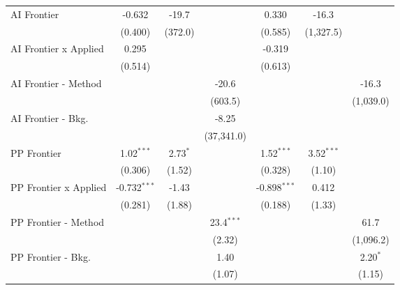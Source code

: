 \begin{tabular}{lcccccc}
   AI Frontier                    & -0.632         & -19.7      &               & 0.330          & -16.3        &   \\   
                                  & (0.400)        & (372.0)    &               & (0.585)        & (1,327.5)    &   \\   
   AI Frontier x Applied          & 0.295          &            &               & -0.319         &              &   \\   
                                  & (0.514)        &            &               & (0.613)        &              &   \\   
   AI Frontier - Method           &                &            & -20.6         &                &              & -16.3\\   
                                  &                &            & (603.5)       &                &              & (1,039.0)\\   
   AI Frontier - Bkg.             &                &            & -8.25         &                &              &   \\   
                                  &                &            & (37,341.0)    &                &              &   \\   
   PP Frontier                    & 1.02$^{***}$   & 2.73$^{*}$ &               & 1.52$^{***}$   & 3.52$^{***}$ &   \\   
                                  & (0.306)        & (1.52)     &               & (0.328)        & (1.10)       &   \\   
   PP Frontier x Applied          & -0.732$^{***}$ & -1.43      &               & -0.898$^{***}$ & 0.412        &   \\   
                                  & (0.281)        & (1.88)     &               & (0.188)        & (1.33)       &   \\   
   PP Frontier - Method           &                &            & 23.4$^{***}$  &                &              & 61.7\\   
                                  &                &            & (2.32)        &                &              & (1,096.2)\\   
   PP Frontier - Bkg.             &                &            & 1.40          &                &              & 2.20$^{*}$\\   
                                  &                &            & (1.07)        &                &              & (1.15)\\   

\end{tabular}
